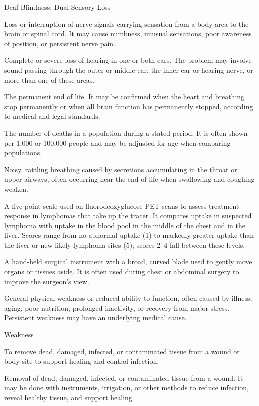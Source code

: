 \synonyms
Deaf-Blindness; Dual Sensory Loss

 Loss or interruption of nerve signals carrying sensation from a body area to the brain or spinal cord. It may cause numbness, unusual sensations, poor awareness of position, or persistent nerve pain.

 Complete or severe loss of hearing in one or both ears. The problem may involve sound passing through the outer or middle ear, the inner ear or hearing nerve, or more than one of these areas.

 The permanent end of life. It may be confirmed when the heart and breathing stop permanently or when all brain function has permanently stopped, according to medical and legal standards.

 The number of deaths in a population during a stated period. It is often shown per 1,000 or 100,000 people and may be adjusted for age when comparing populations.

 Noisy, rattling breathing caused by secretions accumulating in the throat or upper airways, often occurring near the end of life when swallowing and coughing weaken.

 A five-point scale used on fluorodeoxyglucose PET scans to assess treatment response in lymphomas that take up the tracer. It compares uptake in suspected lymphoma with uptake in the blood pool in the middle of the chest and in the liver. Scores range from no abnormal uptake (1) to markedly greater uptake than the liver or new likely lymphoma sites (5); scores 2–4 fall between these levels.

 A hand-held surgical instrument with a broad, curved blade used to gently move organs or tissues aside. It is often used during chest or abdominal surgery to improve the surgeon's view.

 General physical weakness or reduced ability to function, often caused by illness, aging, poor nutrition, prolonged inactivity, or recovery from major stress. Persistent weakness may have an underlying medical cause.

\synonyms
Weakness

 To remove dead, damaged, infected, or contaminated tissue from a wound or body site to support healing and control infection.

 Removal of dead, damaged, infected, or contaminated tissue from a wound. It may be done with instruments, irrigation, or other methods to reduce infection, reveal healthy tissue, and support healing.

